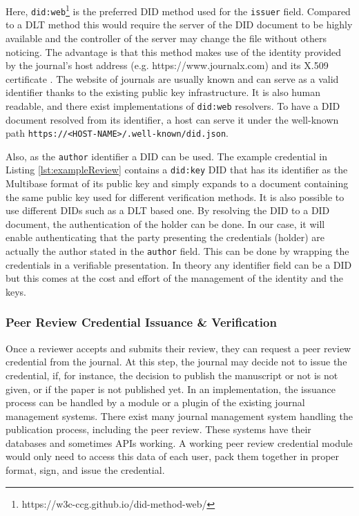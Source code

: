 Here, \lstinline{did:web}\footnote{https://w3c-ccg.github.io/did-method-web/} is the preferred \acrshort{DID} method used for the \lstinline{issuer} field. Compared to a \acrshort{DLT} method this would require the server of the \acrshort{DID} document to be highly available and the controller of the server may change the file without others noticing. The advantage is that this method makes use of the identity provided by the journal's host address (e.g. https://www.journalx.com) and its X.509 certificate \parencite[4]{Barclay.6Nis2020}. The website of journals are usually known and can serve as a valid identifier thanks to the existing public key infrastructure. It is also human readable, and there exist implementations of \lstinline{did:web} resolvers. To have a \acrshort{DID} document resolved from its identifier, a host can serve it under the well-known path \parencite{rfc5785} \lstinline{https://<HOST-NAME>/.well-known/did.json}. 

Also, as the \lstinline{author} identifier a \acrshort{DID} can be used. The example credential in Listing \ref{lst:exampleReview} contains a \lstinline{did:key} \acrshort{DID} \parencite{did-key} that has its identifier as the Multibase format \parencite{multiformats-multibase-03} of its public key and simply expands to a document containing the same public key used for different verification methods. It is also possible to use different \acrshort{DID}s such as a \acrshort{DLT} based one. By resolving the \acrshort{DID} to a \acrshort{DID} document, the authentication of the holder can be done. In our case, it will enable authenticating that the party presenting the credentials (holder) are actually the author stated in the \lstinline{author} field. This can be done by wrapping the credentials in a verifiable presentation. In theory any identifier field can be a \acrshort{DID} but this comes at the cost and effort of the management of the identity and the keys.



\subsubsection{Peer Review Credential Issuance \& Verification}

Once a reviewer accepts and submits their review, they can request a peer review credential from the journal. At this step, the journal may decide not to issue the credential, if, for instance, the decision to publish the manuscript or not is not given, or if the paper is not published yet. In an implementation, the issuance process can be handled by a module or a plugin of the existing journal management systems. There exist many journal management system handling the publication process, including the peer review. These systems have their databases and sometimes \acrshort{API}s working. A working peer review credential module would only need to access this data of each user, pack them together in proper format, sign, and issue the credential. 

